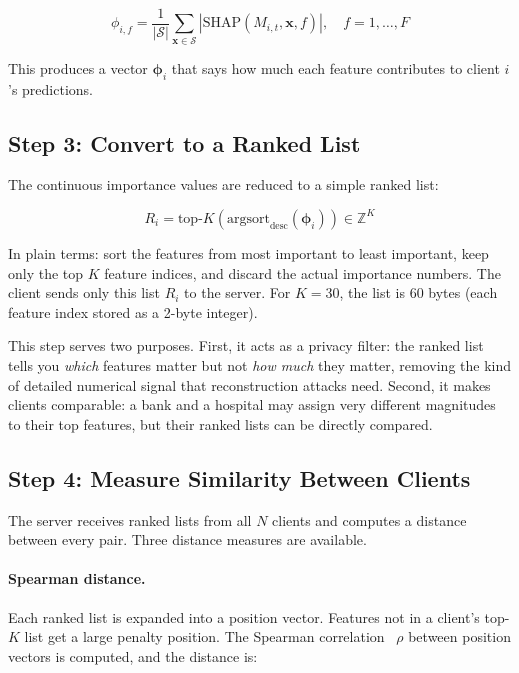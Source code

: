 \documentclass[information,article,submit,pdftex]{mdpi}
\begin{document}
\begin{equation}\label{eq:shap}
  \phi_{i,f} = \frac{1}{|\mathcal{S}|} \sum_{\mathbf{x} \in \mathcal{S}}
  \left| \text{SHAP}(M_{i,t}, \mathbf{x}, f) \right|, \quad f = 1, \ldots, F
\end{equation}

This produces a vector $\boldsymbol{\phi}_i$ that says how much each feature
contributes to client $i$'s predictions.

\subsection{Step 3: Convert to a Ranked List}

The continuous importance values are reduced to a simple ranked list:

\begin{equation}\label{eq:rank}
  R_i = \text{top-}K\!\left(\text{argsort}_{\text{desc}}(\boldsymbol{\phi}_i)
  \right) \in \mathbb{Z}^K
\end{equation}

In plain terms: sort the features from most important to least important, keep
only the top $K$ feature indices, and discard the actual importance numbers. The
client sends only this list $R_i$ to the server. For $K = 30$, the list is
60 bytes (each feature index stored as a 2-byte integer).

This step serves two purposes. First, it acts as a privacy filter: the ranked
list tells you \textit{which} features matter but not \textit{how much} they
matter, removing the kind of detailed numerical signal that reconstruction attacks
need. Second, it makes clients comparable: a bank and a hospital may assign very
different magnitudes to their top features, but their ranked lists can be directly
compared.

\subsection{Step 4: Measure Similarity Between Clients}

The server receives ranked lists from all $N$ clients and computes a distance
between every pair. Three distance measures are available.

\paragraph{Spearman distance.} Each ranked list is expanded into a position
vector. Features not in a client's top-$K$ list get a large penalty position.
The Spearman correlation~\cite{spearman1904proof} $\rho$ between position vectors
is computed, and the distance is:
\end{document}
